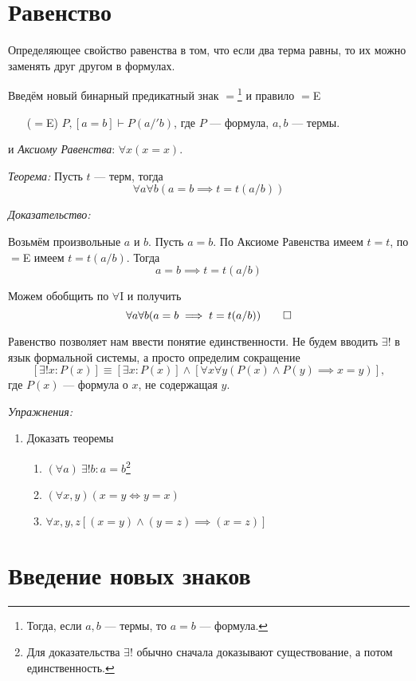 \section{Равенство}

Определяющее свойство равенства в том, что если два терма равны, то их можно
заменять друг другом в формулах.

Введём новый бинарный предикатный знак $=$\footnote{
  Тогда, если $a,b$	 --- термы, то $a=b$ --- формула.}
и правило $=$E
\begin{enumerate}
  \item[($=$E)]{}$P,[a=b]\vdash P(a/'b)$,
  где $P$ --- формула, $a,b$ --- термы.
\end{enumerate}
и {\it Аксиому Равенства}: $\forall x(x=x)$.

\vspace{1em}
{\it Теорема:} Пусть $t$ --- терм, тогда
\[
  \forall a\forall b(a=b\implies t=t(a/b))
\]

{\it Доказательство:}

Возьмём произвольные $a$ и $b$. Пусть $a=b$.
По Аксиоме Равенства имеем $t=t$, по $=$E имеем $t=t(a/b)$.
Тогда
\[
  a=b\implies t=t(a/b)
\]

Можем обобщить по $\forall$I и получить
\[
  \forall a\forall b(a=b\implies t=t(a/b))
  \qed
\]

Равенство позволяет нам ввести понятие единственности.
Не будем вводить $\exists!$ в язык формальной системы, а просто определим сокращение
\[
  [\exists! x:P(x)]\equiv[\exists x:P(x)]\land
  [\forall x\forall y(P(x)\land P(y)\implies x=y)],
\]
где $P(x)$ --- формула о $x$, не содержащая $y$.

\vspace{1em}
{\it Упражнения:}
\begin{enumerate}
  \item{}Доказать теоремы
  \begin{enumerate}
    \item{}$(\forall a)~\exists! b:a=b$\footnote{
      Для доказательства $\exists!$ обычно сначала
      доказывают существование, а потом единственность.
    }
    \item{}$(\forall x,y)(x=y\iff y=x)$
    \item{}$\forall x,y,z[(x=y)\land (y=z)\implies (x=z)]$
  \end{enumerate}
\end{enumerate}

\section{Введение новых знаков}

